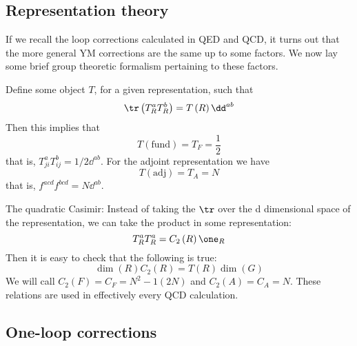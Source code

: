 \documentclass{booc}
\begin{document}
\subsection{Representation theory}

If we recall the loop corrections calculated
in QED and QCD, it turns out that the more general
YM corrections are the same up to some factors. We now lay some brief
group theoretic formalism pertaining to these factors.

Define some object $T$, for a given representation, such that
\begin{equation}
\tr\left( T^a_{R}  T^b_{R}\right) = T\left( R \right) \dd^{ab}
\end{equation}
Then this implies that
\begin{equation}
T\left( \text{fund} \right) = T_F = \frac{1}{2}
\end{equation}
that is, $T^a_{ji} T^b_{ij} = 1/2 \dd^{ab}$. 
For the adjoint representation we have
\begin{equation}
T\left( \text{adj} \right) = T_A = N
\end{equation}
that is, $f^{acd} f^{bcd} = N \dd^{ab}$. 

The quadratic Casimir:
Instead of taking the $\tr$ over the d dimensional space of the representation, we can take
the product in some representation:
\begin{equation}
T_{R}^a T_{R}^a = 
C_2\left( R \right)
\one_{R}
\end{equation}
Then it is easy to check that
the following is true:
\begin{equation}
\dim\left( R \right)C_2\left( R \right) = T\left( R \right)
\dim\left( G \right)
\end{equation}
We will call $C_2\left( F \right) = C_F = N^2 - 1\left( 2N \right)$
and $C_2\left( A \right) = C_A = N$.
These relations are used in effectively every 
QCD calculation.

\subsection{One-loop corrections}
\end{document}
